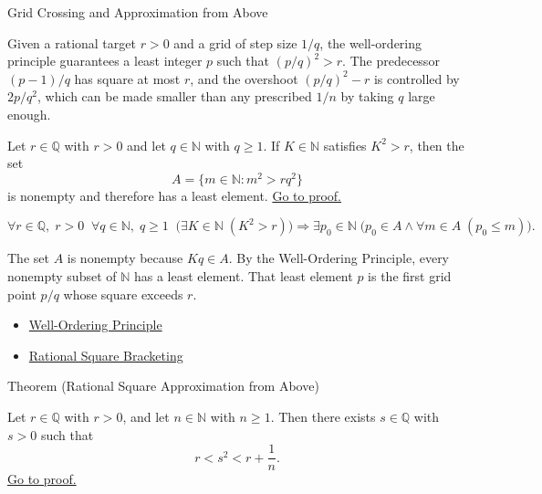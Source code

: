 \begin{topicbox}{Grid Crossing and Approximation from Above}
\begin{exposition}
Given a rational target $r > 0$ and a grid of step size $1/q$, the well-ordering
principle guarantees a least integer $p$ such that $(p/q)^2 > r$. The
predecessor $(p-1)/q$ has square at most $r$, and the overshoot
$(p/q)^2 - r$ is controlled by $2p/q^2$, which can be made smaller than
any prescribed $1/n$ by taking $q$ large enough.
\end{exposition}

\begin{lemma}
\label{lem:first-grid-point-crossing}
Let $r\in\mathbb{Q}$ with $r>0$ and let $q\in\mathbb{N}$ with $q\ge 1$.
If $K\in\mathbb{N}$ satisfies $K^2>r$, then the set
\[
A=\{m\in\mathbb{N}:m^2>rq^2\}
\]
is nonempty and therefore has a least element.
\hyperref[prf:first-grid-point-crossing]{Go to proof.}
\end{lemma}

\begin{remark*}
\[
\forall r\in\mathbb{Q},\;r>0\;\;
\forall q\in\mathbb{N},\;q\ge1\;\;
\bigl(\exists K\in\mathbb{N}\;(K^2>r)\bigr)
\Longrightarrow
\exists p_0\in\mathbb{N}\;\bigl(p_0\in A \land \forall m\in A\;(p_0\le m)\bigr).
\]
\end{remark*}

\begin{remark*}[Interpretation]
The set $A$ is nonempty because $Kq \in A$. By the Well-Ordering Principle,
every nonempty subset of $\mathbb{N}$ has a least element. That least element
$p$ is the first grid point $p/q$ whose square exceeds $r$.
\end{remark*}

\begin{dependencies}
\begin{itemize}
  \item \hyperref[thm:well-ordering-principle]{Well-Ordering Principle}
  \item \hyperref[thm:rational-square-bracketing]{Rational Square Bracketing}
\end{itemize}
\end{dependencies}

\begin{theorembox}{Theorem (Rational Square Approximation from Above)}
\begin{theorem}
\label{thm:rational-square-approximation-from-above}
Let $r\in\mathbb{Q}$ with $r>0$, and let $n\in\mathbb{N}$ with $n\ge 1$.
Then there exists $s\in\mathbb{Q}$ with $s>0$ such that
\[
r<s^2<r+\frac1n.
\]
\hyperref[prf:rational-square-approximation-from-above]{Go to proof.}
\end{theorem}
\end{theorembox}


\end{topicbox}
